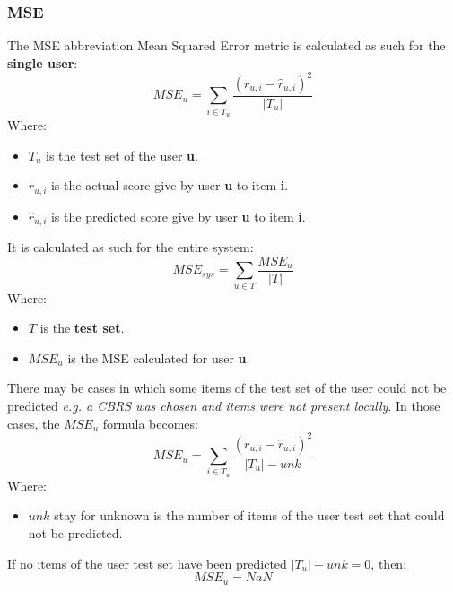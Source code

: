 \documentclass[11pt]{article}
\begin{document}
\subsubsection{MSE}\label{subsubsec:mse}
The MSE abbreviation Mean Squared Error metric is calculated as such for the \textbf{single user}:
\hfill\break
\hfill\break
    \[
        MSE_u = \sum_{i \in T_u} \frac{(r_{u,i} - \hat{r}_{u,i})^2}{|T_u|}
    \]
\hfill\break
\hfill\break
    Where:
\begin{itemize}
    \item $T_u$ is the test set of the user \textbf{u}.
    \item $r_{u, i}$ is the actual score give by user \textbf{u} to item \textbf{i}.
    \item $\hat{r}_{u, i}$ is the predicted score give by user \textbf{u} to item \textbf{i}.
\end{itemize}
\hfill\break
\hfill\break
It is calculated as such for the entire system:
\hfill\break
\hfill\break
    \[
        MSE_{sys} = \sum_{u \in T} \frac{MSE_u}{|T|}
    \]
\hfill\break
\hfill\break
    Where:
\begin{itemize}
    \item $T$ is the \textbf{test set}.
    \item $MSE_u$ is the MSE calculated for user \textbf{u}.
\end{itemize}
\hfill\break
\hfill\break
There may be cases in which some items of the test set of the user could not be predicted
\textit{e.g. a CBRS was chosen and items were not present locally}.
In those cases, the $MSE_u$ formula becomes:
\hfill\break
\hfill\break
    \[
        MSE_u = \sum_{i \in T_u} \frac{(r_{u,i} - \hat{r}_{u,i})^2}{|T_u| - unk}
    \]
\hfill\break
\hfill\break
    Where:
\begin{itemize}
    \item $unk$ stay for unknown is the number of items of the user test set that could not be predicted.
\end{itemize}
\hfill\break
\hfill\break
If no items of the user test set have been predicted $|T_u| - unk = 0$, then:
\hfill\break
\hfill\break
    \[
        MSE_u = NaN
    \]
\hfill\break
\hfill\break

\end{document}
